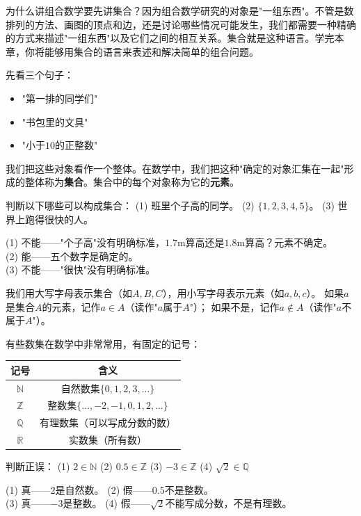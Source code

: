 
为什么讲组合数学要先讲集合？因为组合数学研究的对象是"一组东西"。不管是数排列的方法、画图的顶点和边，还是讨论哪些情况可能发生，我们都需要一种精确的方式来描述"一组东西"以及它们之间的相互关系。集合就是这种语言。学完本章，你将能够用集合的语言来表述和解决简单的组合问题。


先看三个句子：
\begin{itemize}
\item "第一排的同学们"
\item "书包里的文具"
\item "小于$10$的正整数"
\end{itemize}

我们把这些对象看作一个整体。在数学中，我们把这种"确定的对象汇集在一起"形成的整体称为\textbf{集合}。集合中的每个对象称为它的\textbf{元素}。

\begin{example}
判断以下哪些可以构成集合：
(1) 班里个子高的同学。
(2) $\{1,2,3,4,5\}$。
(3) 世界上跑得很快的人。
\end{example}
\begin{solution}
(1) 不能——"个子高"没有明确标准，$1.7$m算高还是$1.8$m算高？元素不确定。\\
(2) 能——五个数字是确定的。\\
(3) 不能——"很快"没有明确标准。
\end{solution}

我们用大写字母表示集合（如$A,B,C$），用小写字母表示元素（如$a,b,c$）。
如果$a$是集合$A$的元素，记作$a\in A$（读作"$a$属于$A$"）；
如果不是，记作$a\notin A$（读作"$a$不属于$A$"）。

有些数集在数学中非常常用，有固定的记号：
\begin{center}
\begin{tabular}{c|c}
记号 & 含义 \\ \hline
$\mathbb N$ & 自然数集$\{0,1,2,3,\dots\}$ \\
$\mathbb Z$ & 整数集$\{\dots,-2,-1,0,1,2,\dots\}$ \\
$\mathbb Q$ & 有理数集（可以写成分数的数） \\
$\mathbb R$ & 实数集（所有数）
\end{tabular}
\end{center}

\begin{example}
判断正误：
(1) $2\in\mathbb N$ \qquad (2) $0.5\in\mathbb Z$ \qquad
(3) $-3\in\mathbb Z$ \qquad (4) $\sqrt2\in\mathbb Q$
\end{example}
\begin{solution}
(1) 真——$2$是自然数。\qquad
(2) 假——$0.5$不是整数。\\
(3) 真——$-3$是整数。\qquad
(4) 假——$\sqrt2$不能写成分数，不是有理数。
\end{solution}

